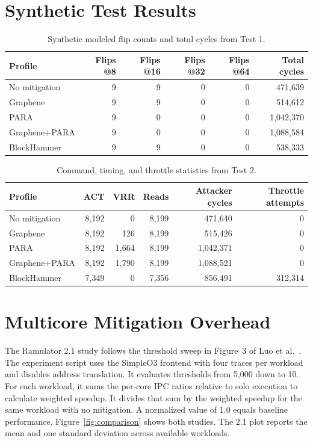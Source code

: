\documentclass[11pt,letterpaper]{article}
\begin{document}
\section{Synthetic Test Results}
\begin{table}[htbp]
\centering\small
\caption{Synthetic modeled flip counts and total cycles from Test 1.}
\begin{tabular}{lrrrrr}
\toprule
\rowcolor{tableblue}
\color{white}\bfseries Profile & \color{white}\bfseries Flips @8 & \color{white}\bfseries Flips @16 & \color{white}\bfseries Flips @32 & \color{white}\bfseries Flips @64 & \color{white}\bfseries Total cycles \\
\midrule
No mitigation & 9 & 9 & 0 & 0 & 471,639 \\
Graphene & 9 & 9 & 0 & 0 & 514,612 \\
PARA & 9 & 0 & 0 & 0 & 1,042,370 \\
Graphene+PARA & 9 & 0 & 0 & 0 & 1,088,584 \\
BlockHammer & 9 & 9 & 0 & 0 & 538,333 \\
\bottomrule
\end{tabular}
\end{table}

\begin{table}[htbp]
\centering\small
\caption{Command, timing, and throttle statistics from Test 2.}
\begin{tabular}{lrrrrr}
\toprule
\rowcolor{tableblue}
\color{white}\bfseries Profile & \color{white}\bfseries ACT & \color{white}\bfseries VRR & \color{white}\bfseries Reads & \color{white}\bfseries Attacker cycles & \color{white}\bfseries Throttle attempts \\
\midrule
No mitigation & 8,192 & 0 & 8,199 & 471,640 & 0 \\
Graphene & 8,192 & 126 & 8,199 & 515,426 & 0 \\
PARA & 8,192 & 1,664 & 8,199 & 1,042,371 & 0 \\
Graphene+PARA & 8,192 & 1,790 & 8,199 & 1,088,521 & 0 \\
BlockHammer & 7,349 & 0 & 7,356 & 856,491 & 312,314 \\
\bottomrule
\end{tabular}
\end{table}

\section{Multicore Mitigation Overhead}
The Ramulator 2.1 study follows the threshold sweep in Figure~3 of Luo et al.~\cite{ramulator20}. The experiment script uses the SimpleO3 frontend with four traces per workload and disables address translation. It evaluates thresholds from 5,000 down to 10. For each workload, it sums the per-core IPC ratios relative to solo execution to calculate weighted speedup. It divides that sum by the weighted speedup for the same workload with no mitigation. A normalized value of 1.0 equals baseline performance. Figure~\ref{fig:comparison} shows both studies. The 2.1 plot reports the mean and one standard deviation across available workloads.
\end{document}
